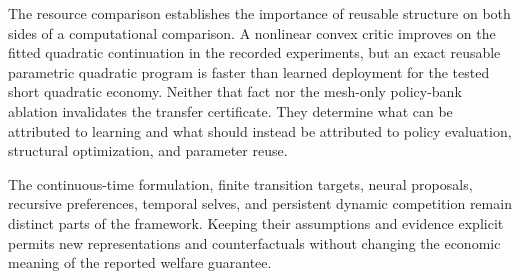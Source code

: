 The resource comparison establishes the importance of reusable structure on both sides of a computational comparison. A nonlinear convex critic improves on the fitted quadratic continuation in the recorded experiments, but an exact reusable parametric quadratic program is faster than learned deployment for the tested short quadratic economy. Neither that fact nor the mesh-only policy-bank ablation invalidates the transfer certificate. They determine what can be attributed to learning and what should instead be attributed to policy evaluation, structural optimization, and parameter reuse.

The continuous-time formulation, finite transition targets, neural proposals, recursive preferences, temporal selves, and persistent dynamic competition remain distinct parts of the framework. Keeping their assumptions and evidence explicit permits new representations and counterfactuals without changing the economic meaning of the reported welfare guarantee.
